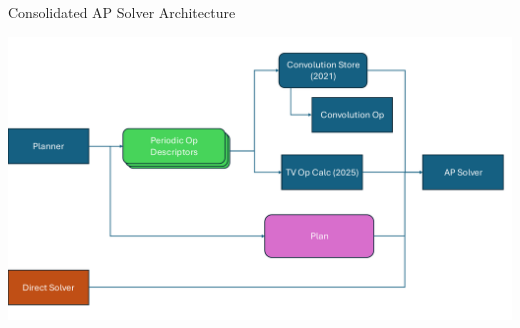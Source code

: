 \begin{frame}{Consolidated AP Solver Architecture}
  \begin{center}
    \includegraphics[width=0.9\linewidth]{nhls_ap_solver_arch.pdf}
  \end{center}
\end{frame}
